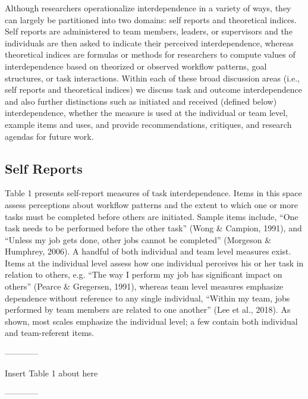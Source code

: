 \documentclass[english,,man]{apa6}
\theoremstyle{definition}
\theoremstyle{definition}
\theoremstyle{definition}
\theoremstyle{remark}
\begin{document}
Although researchers operationalize interdependence in a variety of
ways, they can largely be partitioned into two domains: self reports and
theoretical indices. Self reports are administered to team members,
leaders, or supervisors and the individuals are then asked to indicate
their perceived interdependence, whereas theoretical indices are
formulas or methods for researchers to compute values of interdependence
based on theorized or observed workflow patterns, goal structures, or
task interactions. Within each of these broad discussion areas (i.e.,
self reports and theoretical indices) we discuss task and outcome
interdependence and also further distinctions such as initiated and
received (defined below) interdependence, whether the measure is used at
the individual or team level, example items and uses, and provide
recommendations, critiques, and research agendas for future work.

\hypertarget{self-reports}{%
\subsection{Self Reports}\label{self-reports}}

Table 1 presents self-report measures of task interdependence. Items in
this space assess perceptions about workflow patterns and the extent to
which one or more tasks must be completed before others are initiated.
Sample items include, \enquote{One task needs to be performed before the
other task} (Wong \& Campion, 1991), and \enquote{Unless my job gets
done, other jobs cannot be completed} (Morgeson \& Humphrey, 2006). A
handful of both individual and team level measures exist. Items at the
individual level assess how one individual perceives his or her task in
relation to others, e.g. \enquote{The way I perform my job has
significant impact on others} (Pearce \& Gregersen, 1991), whereas team
level measures emphasize dependence without reference to any single
individual, \enquote{Within my team, jobs performed by team members are
related to one another} (Lee et al., 2018). As shown, most scales
emphasize the individual level; a few contain both individual and
team-referent items.

\begin{center}

------------

Insert Table 1 about here

------------

\end{center}
\end{document}

